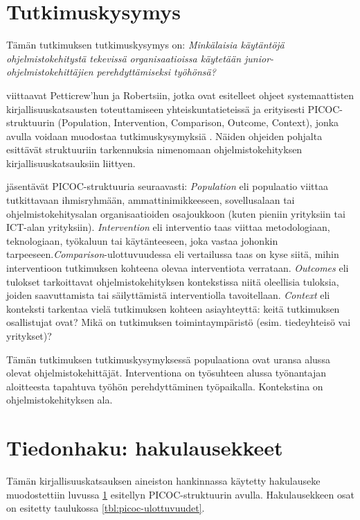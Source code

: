 \documentclass[utf8]{gradu3}
\begin{document}
\section{Tutkimuskysymys}
\label{luku:tutkimuskysymys}

Tämän tutkimuksen tutkimuskysymys on: \textit{Minkälaisia käytäntöjä ohjelmistokehitystä tekevissä organisaatioissa käytetään junior-ohjelmistokehittäjien perehdyttämiseksi työhönsä?}

\textcite{kitchenham-charters-2007} viittaavat Petticrew'hun ja Robertsiin, jotka ovat esitelleet ohjeet systemaattisten kirjallisuuskatsausten toteuttamiseen yhteiskuntatieteissä ja erityisesti PICOC-struktuurin (Population, Intervention, Comparison, Outcome, Context), jonka avulla voidaan muodostaa tutkimuskysymyksiä \parencite{petticrew-roberts-2006}. Näiden ohjeiden pohjalta \textcite{kitchenham-charters-2007} esittävät struktuuriin tarkennuksia nimenomaan ohjelmistokehityksen kirjallisuuskatsauksiin liittyen. 

\textcite{kitchenham-charters-2007} jäsentävät PICOC-struktuuria seuraavasti: \textit{Population} eli populaatio viittaa tutkittavaan ihmisryhmään, ammattinimikkeeseen, sovellusalaan tai ohjelmistokehitysalan organisaatioiden osajoukkoon (kuten pieniin yrityksiin tai ICT-alan yrityksiin). \textit{Intervention} eli interventio taas viittaa metodologiaan, teknologiaan, työkaluun tai käytänteeseen, joka vastaa johonkin tarpeeseen.\textit{Comparison}-ulottuvuudessa eli vertailussa taas on kyse siitä, mihin interventioon tutkimuksen kohteena olevaa interventiota verrataan. \textit{Outcomes} eli tulokset tarkoittavat ohjelmistokehityksen kontekstissa niitä oleellisia tuloksia, joiden saavuttamista tai säilyttämistä interventiolla tavoitellaan. \textit{Context} eli konteksti tarkentaa vielä tutkimuksen kohteen asiayhteyttä: keitä tutkimuksen osallistujat ovat? Mikä on tutkimuksen toimintaympäristö (esim. tiedeyhteisö vai yritykset)? \parencite{kitchenham-charters-2007}

Tämän tutkimuksen tutkimuskysymyksessä populaationa ovat uransa alussa olevat ohjelmistokehittäjät. Interventiona on työsuhteen alussa työnantajan aloitteesta tapahtuva työhön perehdyttäminen työpaikalla. Kontekstina on ohjelmistokehityksen ala. 

\section{Tiedonhaku: hakulausekkeet}

Tämän kirjallisuuskatsauksen aineiston hankinnassa käytetty hakulauseke muodostettiin luvussa  \ref{luku:tutkimuskysymys} esitellyn PICOC-struktuurin avulla. Hakulausekkeen osat on esitetty taulukossa \ref{tbl:picoc-ulottuvuudet}.
\end{document}
